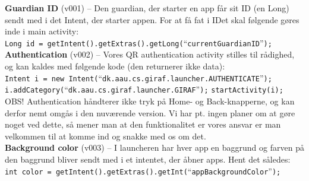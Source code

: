 \textbf{Guardian ID} (v001) -- Den guardian, der starter en app f\aa{}r sit ID (en Long) sendt med i det Intent, der starter appen. For at f\aa{} fat i IDet skal f\o{}lgende g\o{}res inde i main activity:\\

	\verb+Long id = getIntent().getExtras().getLong(+``\verb+currentGuardianID+''\verb+);+\\
	
\textbf{Authentication} (v002) -- Vores QR authentication activity stilles til r\aa{}dighed, og kan kaldes med f\o{}lgende kode (den returnerer ikke data):\\

	\verb+Intent i = new Intent(+``\verb+dk.aau.cs.giraf.launcher.AUTHENTICATE+''\verb+);+
	\verb+i.addCategory(+``\verb+dk.aau.cs.giraf.launcher.GIRAF+''\verb+);+
	\verb+startActivity(i);+\\
	
OBS! Authentication h\aa{}ndterer ikke tryk p\aa{} Home- og Back-knapperne, og kan derfor nemt omg\aa{}s i den nuv\ae{}rende version. Vi har pt. ingen planer om at g\o{}re noget ved dette, s\aa{} mener man at den funktionalitet er vores ansvar er man velkommen til at komme ind og snakke med os om det.\\

\textbf{Background color} (v003) -- I launcheren har hver app en baggrund og farven p\aa{} den baggrund bliver sendt med i et intentet, der \aa{}bner apps. Hent det s\aa{}ledes:\\

\verb+int color = getIntent().getExtras().getInt(+``\verb+appBackgroundColor+''\verb+);+
